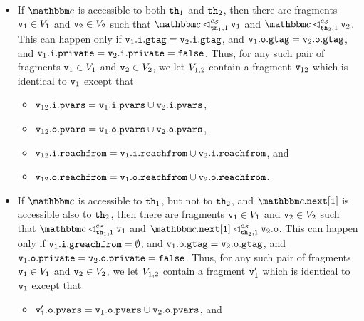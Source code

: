 \begin{itemize}
\item If $\cell$ is accessible to both ${\tt th}_1$ and ${\tt th}_2$, then
  there are fragments $\mathtt{v}_1 \in V_1$ and $\mathtt{v}_2 \in V_2$
  such that $\cell \lsatfrag{1}{\thread_1}{\sconf} \frag_1$ and $\cell \lsatfrag{1}{\thread_2}{\sconf} \frag_2$.
  This can happen only if
  $\mathtt{v}_1.\mathtt{i}.\mathtt{gtag} = \mathtt{v}_2.\mathtt{i}.\mathtt{gtag}$,
  and $\mathtt{v}_1.\mathtt{o}.\mathtt{gtag} = \mathtt{v}_2.\mathtt{o}.\mathtt{gtag}$,
  and $\mathtt{v}_1.\mathtt{i}.\mathtt{private} = \mathtt{v}_2.\mathtt{i}.\mathtt{private} = {\tt false}$.
  Thus, for any such pair of fragments
  $\mathtt{v}_1 \in V_1$ and $\mathtt{v}_2 \in V_2$, we let
  $V_{1,2}$ contain a fragment
 $\mathtt{v}_{12}$ which is identical to $\mathtt{v}_1$ except that
  \begin{itemize}
  \item $\mathtt{v}_{12}.\mathtt{i}.\mathtt{pvars} = \mathtt{v}_1.\mathtt{i}.\mathtt{pvars} \cup \mathtt{v}_2.\mathtt{i}.\mathtt{pvars}$, 
  \item  $\mathtt{v}_{12}.\mathtt{o}.\mathtt{pvars} = \mathtt{v}_1.\mathtt{o}.\mathtt{pvars} \cup \mathtt{v}_2.\mathtt{o}.\mathtt{pvars}$,
  \item $\mathtt{v}_{12}.\mathtt{i}.\mathtt{reachfrom} = \mathtt{v}_{1}.\mathtt{i}.\mathtt{reachfrom} \cup \mathtt{v}_{2}.\mathtt{i}.\mathtt{reachfrom}$, and
   \item $\mathtt{v}_{12}.\mathtt{o}.\mathtt{reachfrom} = \mathtt{v}_{1}.\mathtt{o}.\mathtt{reachfrom} \cup \mathtt{v}_{2}.\mathtt{o}.\mathtt{reachfrom}$.
    \end{itemize}
\item If $\cell$ is accessible to ${\tt th}_1$, but not to ${\tt th}_2$, and
  $\cell.{\tt next[1]}$ is accessible also to ${\tt th}_2$, then
  there are fragments $\mathtt{v}_1 \in V_1$ and $\mathtt{v}_2 \in V_2$
  such that $\cell \lsatfrag{1}{\thread_1}{\sconf} \frag_1$ and
  $\cell.{\tt next[1]} \lsatfrag{1}{\thread_2}{\sconf} \outof{\frag_2}$.
  This can happen only if
  $\mathtt{v}_1.\mathtt{i}.\mathtt{greachfrom} =  \emptyset$,
  and $\mathtt{v}_1.\mathtt{o}.\mathtt{gtag} = \mathtt{v}_2.\mathtt{o}.\mathtt{gtag}$,
  and $\mathtt{v}_1.\mathtt{o}.\mathtt{private} = \mathtt{v}_2.\mathtt{o}.\mathtt{private} = {\tt false}$.
  Thus, for any such pair of fragments
  $\mathtt{v}_1 \in V_1$ and $\mathtt{v}_2 \in V_2$, we let
  $V_{1,2}$ contain a fragment
 $\mathtt{v}_{1}'$ which is identical to $\mathtt{v}_1$ except that
    \begin{itemize}
  \item  $\mathtt{v}_1'.\mathtt{o}.\mathtt{pvars} = \mathtt{v}_1.\mathtt{o}.\mathtt{pvars} \cup \mathtt{v}_2.\mathtt{o}.\mathtt{pvars}$, and

\end{itemize}
\end{itemize}
